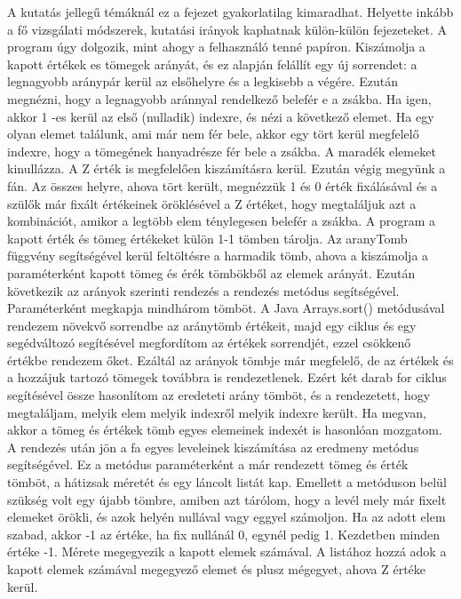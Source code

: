 A kutatás jellegű témáknál ez a fejezet gyakorlatilag kimaradhat.
Helyette inkább a fő vizsgálati módszerek, kutatási irányok kaphatnak külön-külön fejezeteket.
A program úgy dolgozik, mint ahogy a felhasználó tenné papíron. Kiszámolja a kapott értékek es tömegek arányát, és ez alapján felállít egy új sorrendet: a legnagyobb aránypár kerül az elsőhelyre és a legkisebb a végére. Ezután megnézni, hogy a legnagyobb aránnyal rendelkező belefér e a zsákba. Ha igen, akkor 1 -es kerül az első (nulladik) indexre, és nézi a következő elemet. Ha egy olyan elemet találunk, ami már nem fér bele, akkor egy tört kerül megfelelő indexre, hogy a tömegének hanyadrésze fér bele a zsákba. A maradék elemeket kinullázza. A Z érték is megfelelően kiszámításra kerül. Ezután végig megyünk a fán. Az összes helyre, ahova tört került, megnézzük 1 és 0 érték fixálásával és a szülők már fixált értékeinek öröklésével  a Z értéket, hogy megtaláljuk azt a kombinációt, amikor a legtöbb elem ténylegesen belefér a zsákba.
A program a kapott érték és tömeg értékeket külön 1-1 tömben tárolja. Az aranyTomb függvény segítségével kerül feltöltésre a harmadik tömb, ahova a kiszámolja a paraméterként kapott tömeg és érék tömbökből az elemek arányát. Ezután következik az arányok szerinti rendezés a rendezés metódus segítségével. Paraméterként megkapja mindhárom tömböt. A Java Arrays.sort() metódusával rendezem növekvő sorrendbe az aránytömb értékeit, majd egy ciklus és egy segédváltozó segítésével megfordítom az értékek sorrendjét, ezzel csökkenő értékbe rendezem őket. Ezáltál az arányok tömbje már megfelelő, de az értékek és a hozzájuk tartozó tömegek továbbra is rendezetlenek. Ezért két darab for ciklus segítésével össze hasonlítom az eredeteti arány tömböt, és a rendezetett, hogy megtaláljam, melyik elem melyik indexről melyik indexre került. Ha megvan, akkor a tömeg és értékek tömb egyes elemeinek indexét is hasonlóan mozgatom. 
A rendezés után jön a fa egyes leveleinek kiszámítása az eredmeny metódus segítségével. Ez a metódus paraméterként a már rendezett tömeg és érték tömböt, a hátizsak méretét és egy láncolt listát kap. Emellett a metóduson belül szükség volt egy újabb tömbre, amiben azt tárólom, hogy a levél mely már fixelt elemeket örökli, és azok helyén nullával vagy eggyel számoljon. Ha az adott elem szabad, akkor -1 az értéke, ha fix nullánál 0, egynél pedig 1. Kezdetben minden értéke -1. Mérete megegyezik a kapott elemek számával. A listához hozzá adok a kapott elemek számával megegyező elemet és plusz mégegyet, ahova Z értéke kerül.
